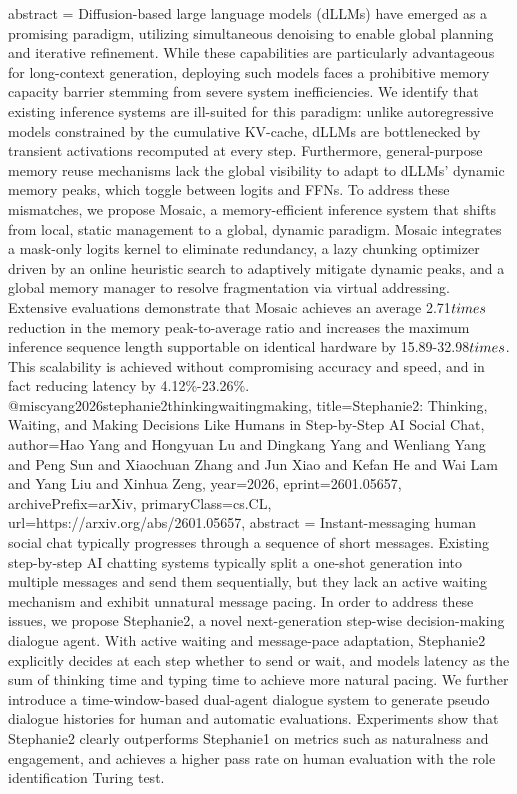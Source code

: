 {      abstract = {Diffusion-based large language models (dLLMs) have emerged as a promising paradigm, utilizing simultaneous denoising to enable global planning and iterative refinement. While these capabilities are particularly advantageous for long-context generation, deploying such models faces a prohibitive memory capacity barrier stemming from severe system inefficiencies. We identify that existing inference systems are ill-suited for this paradigm: unlike autoregressive models constrained by the cumulative KV-cache, dLLMs are bottlenecked by transient activations recomputed at every step. Furthermore, general-purpose memory reuse mechanisms lack the global visibility to adapt to dLLMs' dynamic memory peaks, which toggle between logits and FFNs. To address these mismatches, we propose Mosaic, a memory-efficient inference system that shifts from local, static management to a global, dynamic paradigm. Mosaic integrates a mask-only logits kernel to eliminate redundancy, a lazy chunking optimizer driven by an online heuristic search to adaptively mitigate dynamic peaks, and a global memory manager to resolve fragmentation via virtual addressing. Extensive evaluations demonstrate that Mosaic achieves an average 2.71$\\times$ reduction in the memory peak-to-average ratio and increases the maximum inference sequence length supportable on identical hardware by 15.89-32.98$\\times$. This scalability is achieved without compromising accuracy and speed, and in fact reducing latency by 4.12\%-23.26\%.}
}@misc{yang2026stephanie2thinkingwaitingmaking,
      title={Stephanie2: Thinking, Waiting, and Making Decisions Like Humans in Step-by-Step AI Social Chat}, 
      author={Hao Yang and Hongyuan Lu and Dingkang Yang and Wenliang Yang and Peng Sun and Xiaochuan Zhang and Jun Xiao and Kefan He and Wai Lam and Yang Liu and Xinhua Zeng},
      year={2026},
      eprint={2601.05657},
      archivePrefix={arXiv},
      primaryClass={cs.CL},
      url={https://arxiv.org/abs/2601.05657},
      abstract = {Instant-messaging human social chat typically progresses through a sequence of short messages. Existing step-by-step AI chatting systems typically split a one-shot generation into multiple messages and send them sequentially, but they lack an active waiting mechanism and exhibit unnatural message pacing. In order to address these issues, we propose Stephanie2, a novel next-generation step-wise decision-making dialogue agent. With active waiting and message-pace adaptation, Stephanie2 explicitly decides at each step whether to send or wait, and models latency as the sum of thinking time and typing time to achieve more natural pacing. We further introduce a time-window-based dual-agent dialogue system to generate pseudo dialogue histories for human and automatic evaluations. Experiments show that Stephanie2 clearly outperforms Stephanie1 on metrics such as naturalness and engagement, and achieves a higher pass rate on human evaluation with the role identification Turing test.}
}
